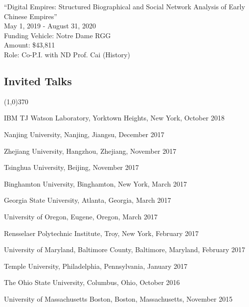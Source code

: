 \documentclass[10pt]{article}
\newenvironment{myindentpar}[1]%
{\begin{list}{}%
         {\setlength{\leftmargin}{#1}}%
         \item[]%
}
{\end{list}}
\newcounter{list}
\begin{document}
\begin{myindentpar}{0.75cm}

\hspace{-0.75cm}``Digital Empires: Structured Biographical and Social Network Analysis of Early Chinese Empires''\\
May 1, 2019 - August 31, 2020 \\
Funding Vehicle: Notre Dame RGG \\
Amount: \$43,811 \\
Role: Co-P.I. with ND Prof. Cai (History)

\end{myindentpar}

\subsection{\sc Invited Talks}
\vspace{-0.4cm} \line(1,0){370} \vspace{-0.1cm}

\begin{myindentpar}{0.75cm}

\hspace{-0.75cm} IBM TJ Watson Laboratory, Yorktown Heights, New York, October 2018
	
\hspace{-0.75cm} Nanjing University, Nanjing, Jiangsu, December 2017


\hspace{-0.75cm} Zhejiang University, Hangzhou, Zhejiang, November 2017

\hspace{-0.75cm} Tsinghua University, Beijing, November 2017

\hspace{-0.75cm} Binghamton University, Binghamton, New York, March 2017

\hspace{-0.75cm} Georgia State University, Atlanta, Georgia, March 2017

\hspace{-0.75cm} University of Oregon, Eugene, Oregon, March 2017

\hspace{-0.75cm} Rensselaer Polytechnic Institute, Troy, New York, February 2017

\hspace{-0.75cm} University of Maryland, Baltimore County, Baltimore, Maryland, February 2017

\hspace{-0.75cm} Temple University, Philadelphia, Pennsylvania, January 2017

\hspace{-0.75cm} The Ohio State University, Columbus, Ohio, October 2016

\hspace{-0.75cm} University of Massachusetts Boston, Boston, Massachusetts, November 2015

\end{myindentpar}
\end{document}
